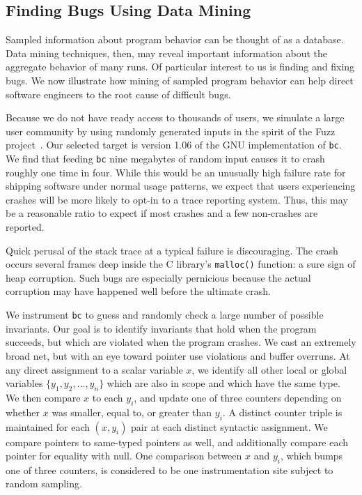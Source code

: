 

\subsection{Finding Bugs Using Data Mining}

Sampled information about program behavior can be thought of as a
database.  Data mining techniques, then, may reveal important
information about the aggregate behavior of many runs.  Of particular
interest to us is finding and fixing bugs.  We now illustrate how
mining of sampled program behavior can help direct software engineers
to the root cause of difficult bugs.

Because we do not have ready access to thousands of users, we simulate
a large user community by using randomly generated inputs in the
spirit of the Fuzz project~\cite{MKLMMNS95}.  Our selected target is
version 1.06 of the GNU implementation of \texttt{bc}.  We find that
feeding \texttt{bc} nine megabytes of random input causes it to crash
roughly one time in four.  While this would be an unusually high
failure rate for shipping software under normal usage patterns, we
expect that users experiencing crashes will be more likely to opt-in
to a trace reporting system.  Thus, this may be a reasonable ratio to
expect if most crashes and a few non-crashes are reported.

Quick perusal of the stack trace at a typical failure is discouraging.
The crash occurs several frames deep inside the C library's
\texttt{malloc()} function: a sure sign of heap corruption.  Such bugs
are especially pernicious because the actual corruption may have
happened well before the ultimate crash.  

We instrument \texttt{bc} to guess and randomly check a large number
of possible invariants.  Our goal is to identify invariants that hold
when the program succeeds, but which are violated when the program
crashes.  We cast an extremely broad net, but with an eye toward
pointer use violations and buffer overruns.  At any direct assignment
to a scalar variable $x$, we identify all other local or global
variables $\{ y_1, y_2, \dots, y_n \}$ which are also in scope and
which have the same type.  We then compare $x$ to each $y_i$, and
update one of three counters depending on whether $x$ was smaller,
equal to, or greater than $y_i$.  A distinct counter triple is
maintained for each $(x, y_i)$ pair at each distinct syntactic
assignment.  We compare pointers to same-typed pointers as well, and
additionally compare each pointer for equality with null.  One
comparison between $x$ and $y_i$, which bumps one of three counters,
is considered to be one instrumentation site subject to random
sampling.

